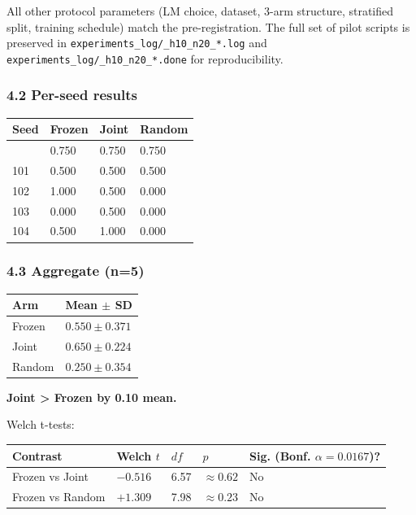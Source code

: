 \documentclass[
]{article}
\newcounter{none} %
\begin{document}
All other protocol parameters (LM choice, dataset, 3-arm structure,
stratified split, training schedule) match the pre-registration. The
full set of pilot scripts is preserved in
\texttt{experiments\_log/\_h10\_n20\_*.log} and
\texttt{experiments\_log/\_h10\_n20\_*.done} for reproducibility.

\subsubsection{4.2 Per-seed results}\label{per-seed-results}

{\def\LTcaptype{none} %
\begin{longtable}[]{@{}llll@{}}
\toprule\noalign{}
Seed & Frozen & Joint & Random \\
\midrule\noalign{}
\endhead
\bottomrule\noalign{}
\endlastfoot
100 & 0.750 & 0.750 & 0.750 \\
101 & 0.500 & 0.500 & 0.500 \\
102 & 1.000 & 0.500 & 0.000 \\
103 & 0.000 & 0.500 & 0.000 \\
104 & 0.500 & 1.000 & 0.000 \\
\end{longtable}
}

\subsubsection{4.3 Aggregate (n=5)}\label{aggregate-n5}

{\def\LTcaptype{none} %
\begin{longtable}[]{@{}ll@{}}
\toprule\noalign{}
Arm & Mean \(\pm\) SD \\
\midrule\noalign{}
\endhead
\bottomrule\noalign{}
\endlastfoot
Frozen & \(0.550 \pm 0.371\) \\
Joint & \(\mathbf{0.650} \pm 0.224\) \\
Random & \(0.250 \pm 0.354\) \\
\end{longtable}
}

\textbf{Joint \textgreater{} Frozen by 0.10 mean.}

Welch t-tests:

{\def\LTcaptype{none} %
\begin{longtable}[]{@{}lllll@{}}
\toprule\noalign{}
Contrast & Welch \(t\) & \(df\) & \(p\) & Sig. (Bonf.
\(\alpha=0.0167\))? \\
\midrule\noalign{}
\endhead
\bottomrule\noalign{}
\endlastfoot
Frozen vs Joint & \(-0.516\) & 6.57 & \(\approx 0.62\) & No \\
Frozen vs Random & \(+1.309\) & 7.98 & \(\approx 0.23\) & No \\
\end{longtable}
}
\end{document}
